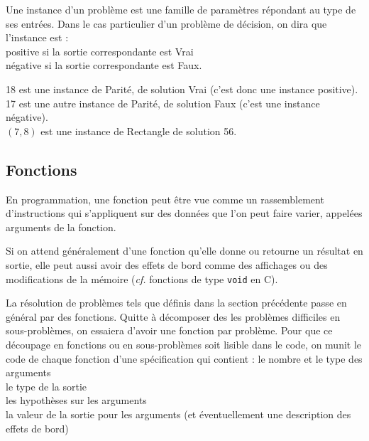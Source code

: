 		\begin{Definition}
			Une instance d'un problème est une famille de paramètres répondant au type de ses entrées. \nt
			Dans le cas particulier d'un problème de décision, on dira que l'instance est : \\
				 \bdot positive si la sortie correspondante est Vrai \\
				 \bdot négative si la sortie correspondante est Faux.
		\end{Definition}
		
		\begin{Exemples}
			18 est une instance de \textsf{Parité}, de solution Vrai (c'est donc une instance positive). \\
			17 est une autre instance de \textsf{Parité}, de solution Faux (c'est une instance négative). \\
			\((7,8)\) est une instance de \textsf{Rectangle} de solution 56.
		\end{Exemples}
			
			
	\subsection{Fonctions}
		
		\begin{Definition}
			En programmation, une fonction peut être vue comme un rassemblement d'instructions qui s'appliquent sur des données que l'on peut faire varier, appelées arguments de la fonction.
		\end{Definition}
		
		\begin{Remarque}
			Si on attend généralement d'une fonction qu'elle donne ou retourne un résultat en sortie, elle peut aussi avoir des effets de bord comme des affichages ou des modifications de la mémoire (\emph{cf.} fonctions de type \texttt{void} en C).
		\end{Remarque}
		
	La résolution de problèmes tels que définis dans la section précédente passe en général par des fonctions.
	Quitte à décomposer des les problèmes difficiles en sous-problèmes, on essaiera d'avoir une fonction par problème. \nll
	Pour que ce découpage en fonctions ou en sous-problèmes soit lisible dans le code, on munit le code de chaque fonction d'une spécification qui contient : \nt
		 \bdot le nombre et le type des arguments \\
		 \bdot le type de la sortie \\
		 \bdot les hypothèses sur les arguments \\
		 \bdot la valeur de la sortie pour les arguments (et éventuellement une description des effets de bord)
		
